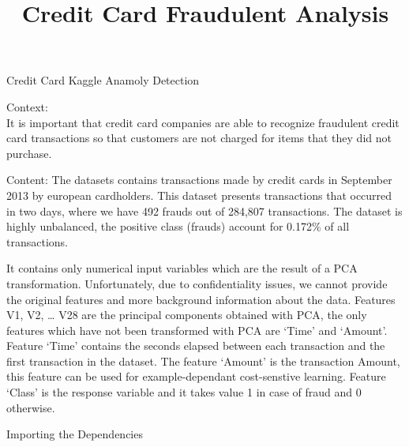 \documentclass[11pt]{article}
\title{Credit Card Fraudulent Analysis}
\begin{document}
    
    \maketitle
    
    

    
    Credit Card Kaggle Anamoly Detection

    Context:\\
It is important that credit card companies are able to recognize
fraudulent credit card transactions so that customers are not charged
for items that they did not purchase.

    Content: The datasets contains transactions made by credit cards in
September 2013 by european cardholders. This dataset presents
transactions that occurred in two days, where we have 492 frauds out of
284,807 transactions. The dataset is highly unbalanced, the positive
class (frauds) account for 0.172\% of all transactions.

It contains only numerical input variables which are the result of a PCA
transformation. Unfortunately, due to confidentiality issues, we cannot
provide the original features and more background information about the
data. Features V1, V2, \ldots{} V28 are the principal components
obtained with PCA, the only features which have not been transformed
with PCA are `Time' and `Amount'. Feature `Time' contains the seconds
elapsed between each transaction and the first transaction in the
dataset. The feature `Amount' is the transaction Amount, this feature
can be used for example-dependant cost-senstive learning. Feature
`Class' is the response variable and it takes value 1 in case of fraud
and 0 otherwise.

    Importing the Dependencies
\end{document}
